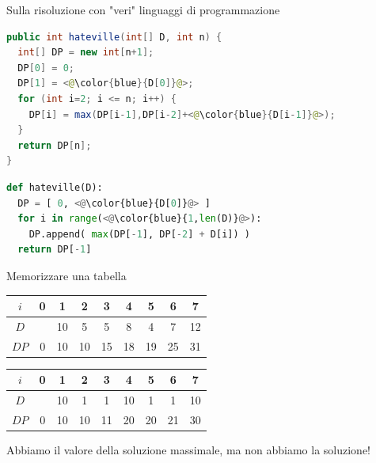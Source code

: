 \begin{frame}[fragile]{Sulla risoluzione con "veri" linguaggi di programmazione}

\begin{lstlisting}[language=java]
public int hateville(int[] D, int n) {
  int[] DP = new int[n+1];
  DP[0] = 0;
  DP[1] = <@\color{blue}{D[0]}@>;
  for (int i=2; i <= n; i++) {
    DP[i] = max(DP[i-1],DP[i-2]+<@\color{blue}{D[i-1]}@>);
  }
  return DP[n];
}
\end{lstlisting}

\begin{lstlisting}[language=python]
def hateville(D):
  DP = [ 0, <@\color{blue}{D[0]}@> ]
  for i in range(<@\color{blue}{1,len(D)}@>):
    DP.append( max(DP[-1], DP[-2] + D[i]) )
  return DP[-1]
\end{lstlisting}


\end{frame}



\begin{frame}{Memorizzare una tabella}

\vspace{-9pt}
\begin{myboxtitle}[Esempi]
\begin{center}
\medskip
\begin{tabular}{|c|c|c|c|c|c|c|c|c|}
\hline
$i$ & 0 & 1 & 2 & 3 & 4 & 5 & 6 & 7 \\\hline
$D$ &   & 10 & 5 & 5 & 8 & 4 & 7 & 12 \\\hline
$DP$ & 0 & 10 & 10 & 15 & 18 & 19 & 25 & 31 \\\hline
\end{tabular}

\medskip
\begin{tabular}{|c|c|c|c|c|c|c|c|c|}
\hline
$i$ & 0 & 1 & 2 & 3 & 4 & 5 & 6 & 7 \\\hline
$D$ &   & 10 & 1 & 1 & 10 & 1 & 1 & 10 \\\hline
$DP$ & 0 & 10 & 10 & 11 & 20 & 20 & 21 & 30 \\\hline
\end{tabular}
\end{center}
\end{myboxtitle}

\begin{myboxtitle}[Problema]
Abbiamo il valore della soluzione massimale, ma non abbiamo
la soluzione!
\end{myboxtitle}

\end{frame}

